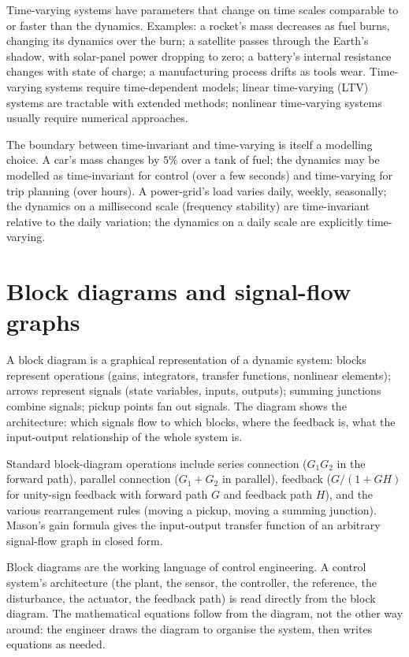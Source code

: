 Time-varying systems have parameters that change on time scales comparable to or faster than the dynamics. Examples: a rocket's mass decreases as fuel burns, changing its dynamics over the burn; a satellite passes through the Earth's shadow, with solar-panel power dropping to zero; a battery's internal resistance changes with state of charge; a manufacturing process drifts as tools wear. Time-varying systems require time-dependent models; linear time-varying (LTV) systems are tractable with extended methods; nonlinear time-varying systems usually require numerical approaches.

The boundary between time-invariant and time-varying is itself a modelling choice. A car's mass changes by $5\%$ over a tank of fuel; the dynamics may be modelled as time-invariant for control (over a few seconds) and time-varying for trip planning (over hours). A power-grid's load varies daily, weekly, seasonally; the dynamics on a millisecond scale (frequency stability) are time-invariant relative to the daily variation; the dynamics on a daily scale are explicitly time-varying.

\section{Block diagrams and signal-flow graphs}

A block diagram is a graphical representation of a dynamic system: blocks represent operations (gains, integrators, transfer functions, nonlinear elements); arrows represent signals (state variables, inputs, outputs); summing junctions combine signals; pickup points fan out signals. The diagram shows the architecture: which signals flow to which blocks, where the feedback is, what the input-output relationship of the whole system is.

Standard block-diagram operations include series connection ($G_1 G_2$ in the forward path), parallel connection ($G_1 + G_2$ in parallel), feedback ($G/(1+GH)$ for unity-sign feedback with forward path $G$ and feedback path $H$), and the various rearrangement rules (moving a pickup, moving a summing junction). Mason's gain formula gives the input-output transfer function of an arbitrary signal-flow graph in closed form.

Block diagrams are the working language of control engineering. A control system's architecture (the plant, the sensor, the controller, the reference, the disturbance, the actuator, the feedback path) is read directly from the block diagram. The mathematical equations follow from the diagram, not the other way around: the engineer draws the diagram to organise the system, then writes equations as needed.

